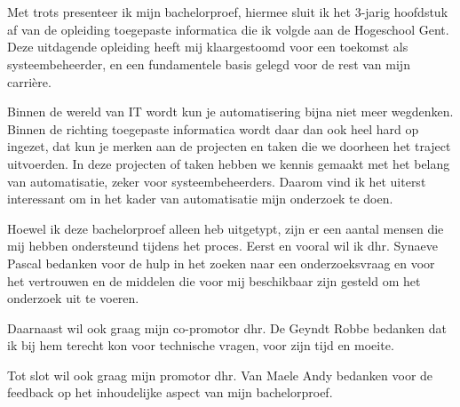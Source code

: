 
\chapter*{}%
\label{ch:voorwoord}


Met trots presenteer ik mijn bachelorproef, hiermee sluit ik het 3-jarig hoofdstuk af van de opleiding 
toegepaste informatica die ik volgde aan de Hogeschool Gent. Deze uitdagende opleiding heeft mij klaargestoomd 
voor een toekomst als systeembeheerder, en een fundamentele basis gelegd voor de rest van mijn carrière.

Binnen de wereld van IT wordt kun je automatisering bijna niet meer wegdenken. Binnen de richting toegepaste informatica wordt 
daar dan ook heel hard op ingezet, dat kun je merken aan de projecten en taken die we doorheen het traject uitvoerden. 
In deze projecten of taken hebben we kennis gemaakt met het belang van automatisatie, zeker voor systeembeheerders. 
Daarom vind ik het uiterst interessant om in het kader van automatisatie mijn onderzoek te doen.

Hoewel ik deze bachelorproef alleen heb uitgetypt, zijn er een aantal mensen die mij hebben ondersteund tijdens het proces.
Eerst en vooral wil ik dhr. Synaeve Pascal bedanken voor de hulp in het zoeken naar een onderzoeksvraag en voor 
het vertrouwen en de middelen die voor mij beschikbaar zijn gesteld om het onderzoek uit te voeren.

Daarnaast wil ook graag mijn co-promotor dhr. De Geyndt Robbe bedanken dat ik bij hem terecht kon voor technische vragen, 
voor zijn tijd en moeite.

Tot slot wil ook graag mijn promotor dhr. Van Maele Andy bedanken voor de feedback op het inhoudelijke aspect van mijn bachelorproef.

